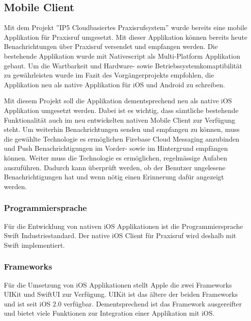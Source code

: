 
\subsection{Mobile Client}

Mit dem Projekt ''IP5 Cloudbasiertes Praxisrufsystem'' wurde bereits eine mobile Applikation für Praxisruf umgesetzt.
Mit dieser Applikation können bereits heute Benachrichtungen über Praxisruf versendet und empfangen werden.\cite{ip5}
Die bestehende Applikation wurde mit Nativescript\cite{nativescript} als Multi-Platform Applikation gebaut.
Um die Wartbarkeit und Hardware- sowie Betriebssystemkomaptibilität zu gewährleisten wurde im Fazit des Vorgängerprojekts empfohlen,
die Applikation neu als native Applikation für iOS und Android zu schreiben.\cite{ip5}

Mit diesem Projekt soll die Applikation dementsprechend neu als native iOS Applikation umgesetzt werden.
Dabei ist es wichtig, dass sämtliche bestehende Funktionalität auch im neu entwickelten nativen Mobile Client zur Verfügung steht.
Um weiterhin Benachrichtungen senden und empfangen zu können, muss die gewählte Technologie es ermöglichen Firebase Cloud Messaging anzubinden
und Push Benachrichtigungen im Vorder- sowie im Hintergrund empfängen können.
Weiter muss die Technologie es ermöglichen, regelmässige Aufaben auszuführen.
Dadurch kann überprüft werden, ob der Benutzer ungelesene Benachrichtigungen hat und wenn nötig einen Erinnerung dafür angezeigt werden.

\subsubsection*{Programmiersprache}

Für die Entwicklung von nativen iOS Applikationen ist die Programmiersprache Swift Industriestandard.\cite{ios_swift}
Der native iOS Client für Praxisruf wird deshalb mit Swift implementiert.

\subsubsection*{Frameworks}

Für die Umsetzung von iOS Applikationen stellt Apple die zwei Frameworks UIKit\cite{ios_uikit} und SwiftUI\cite{ios_swift_ui} zur Verfügung.
UIKit ist das ältere der beiden Frameworks und ist seit iOS 2.0 verfügbar.
Dementsprechend ist das Framework ausgereifter und bietet viele Funktionen zur Integration einer Applikation mit iOS.\cite{ios_uikit}

